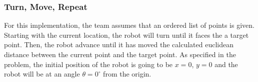 \documentclass[12pt,conference,onecolumn]{IEEEtran} %
\begin{document}
\subsubsection{Turn, Move, Repeat}
For this implementation, the team assumes that an ordered list of points is given. Starting with the current location, the robot will turn until it faces the a target point. Then, the robot advance until it has moved the calculated euclidean distance between the current point and the target point. As specified in the problem, the initial position of the robot is going to be $x=0$, $y=0$ and the robot will be at an angle $\theta=0^{\circ}$ from the origin.

\end{document}
